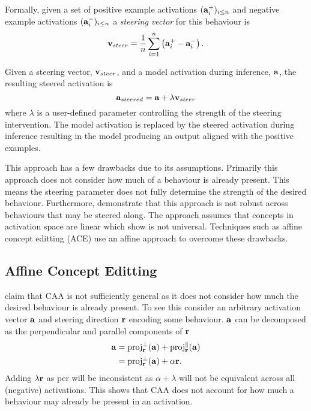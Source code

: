 Formally, given a set of positive example activations $(\mathbf{a}_i^+)_{i\le n}$ and negative example activations $(\mathbf{a}_i^-)_{i\le n}$ a \textit{steering vector} for this behaviour is
\[\mathbf{v}_{steer} = \frac{1}{n}\sum_{i=1}^{n}\left(\mathbf{a}_i^+ - \mathbf{a}_i^-\right).\]

Given a steering vector, $\mathbf{v}_{steer}$, and a model activation during inference, $\mathbf{a}$, the resulting steered activation is
\begin{equation}
    \label{eq:caa}
    \mathbf{a}_{steered} = \mathbf{a} + \lambda\mathbf{v}_{steer}
\end{equation}
where $\lambda$ is a user-defined parameter controlling the strength of the steering intervention.
The model activation is replaced by the steered activation during inference resulting in the model producing an output aligned with the positive examples.

This approach has a few drawbacks \cite{steerability, ace, non-linear-features} due to its assumptions.
Primarily this approach does not consider how much of a behaviour is already present.
This means the steering parameter does not fully determine the strength of the desired behaviour.
Furthermore, \citet{steerability} demonstrate that this approach is not robust across behaviours that may be steered along.
The approach assumes that concepts in activation space are linear which \citet{non-linear-features} show is not universal.
Techniques such as affine concept editting (ACE)  use an affine approach to overcome these drawbacks.

\subsection{Affine Concept Editting}
\label{ace}

\citet{ace} claim that CAA \cite{caa} is not sufficiently general as it does not consider how much the desired behaviour is already present.
To see this consider an arbitrary activation vector $\mathbf{a}$ and steering direction $\mathbf{r}$ encoding some behaviour.
$\mathbf{a}$ can be decomposed as the perpendicular and parallel components of $\mathbf{r}$
\begin{align*}
    \mathbf{a} &= \text{proj}_{\mathbf{r}}^{\perp}(\mathbf{a}) + \text{proj}_{\mathbf{r}}^{\parallel}(\mathbf{a}) \\
        &= \text{proj}_{\mathbf{r}}^{\perp}(\mathbf{a}) + \alpha\mathbf{r}.
\end{align*}
Adding $\lambda\mathbf{r}$ as per  will be inconsistent as $\alpha + \lambda$ will not be equivalent across all (negative) activations.
This shows that CAA \cite{caa} does not account for how much a behaviour may already be present in an activation.

